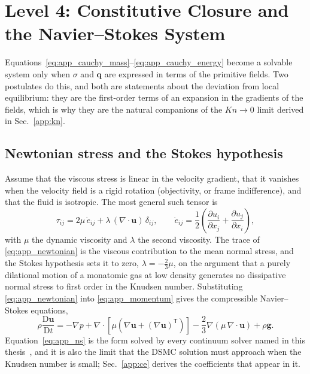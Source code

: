 \section{Level 4: Constitutive Closure and the Navier--Stokes System}
\label{app:closure}

Equations~\eqref{eq:app_cauchy_mass}--\eqref{eq:app_cauchy_energy} become a solvable system only when $\sigma$ and $\mathbf{q}$ are expressed in terms of the primitive fields. Two postulates do this, and both are statements about the deviation from local equilibrium: they are the first-order terms of an expansion in the gradients of the fields, which is why they are the natural companions of the $Kn \to 0$ limit derived in Sec.~\ref{app:kn}.

\subsection{Newtonian stress and the Stokes hypothesis}

Assume that the viscous stress is linear in the velocity gradient, that it vanishes when the velocity field is a rigid rotation (objectivity, or frame indifference), and that the fluid is isotropic. The most general such tensor is
\begin{equation}
    \tau_{ij} = 2\mu\,\dot{e}_{ij} + \lambda\,(\nabla\cdot\mathbf{u})\,\delta_{ij} ,
    \qquad
    \dot{e}_{ij} = \frac{1}{2}\left(\frac{\partial u_i}{\partial x_j} + \frac{\partial u_j}{\partial x_i}\right) ,
    \label{eq:app_newtonian}
\end{equation}
with $\mu$ the dynamic viscosity and $\lambda$ the second viscosity. The trace of \eqref{eq:app_newtonian} is the viscous contribution to the mean normal stress, and the Stokes hypothesis sets it to zero, $\lambda = -\tfrac23\mu$, on the argument that a purely dilational motion of a monatomic gas at low density generates no dissipative normal stress to first order in the Knudsen number. Substituting \eqref{eq:app_newtonian} into \eqref{eq:app_momentum} gives the compressible Navier--Stokes equations,
\begin{equation}
    \rho\frac{\mathrm{D}\mathbf{u}}{\mathrm{D}t} = -\nabla p + \nabla\cdot\left[\mu\left(\nabla\mathbf{u} + (\nabla\mathbf{u})^{\mathsf T}\right)\right] - \frac{2}{3}\nabla(\mu\,\nabla\cdot\mathbf{u}) + \rho\mathbf{g} .
    \label{eq:app_ns}
\end{equation}
Equation~\eqref{eq:app_ns} is the form solved by every continuum solver named in this thesis~\cite{white2006viscous,AndersonHypersonic}, and it is also the limit that the DSMC solution must approach when the Knudsen number is small; Sec.~\ref{app:ce} derives the coefficients that appear in it.

